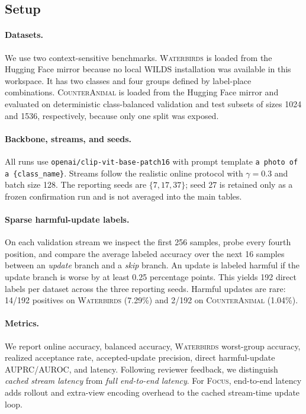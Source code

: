 \documentclass{article}
\newcommand{\focus}{\textsc{Focus}}
\newcommand{\wb}{\textsc{Waterbirds}}
\newcommand{\ca}{\textsc{CounterAnimal}}
\begin{document}
\subsection{Setup}

\paragraph{Datasets.}
We use two context-sensitive benchmarks. \wb{} is loaded from the Hugging Face mirror because no local WILDS installation was available in this workspace. It has two classes and four groups defined by label-place combinations. \ca{} is loaded from the Hugging Face mirror and evaluated on deterministic class-balanced validation and test subsets of sizes 1024 and 1536, respectively, because only one split was exposed.

\paragraph{Backbone, streams, and seeds.}
All runs use \texttt{openai/clip-vit-base-patch16} with prompt template \texttt{a photo of a \{class\_name\}}. Streams follow the realistic online protocol with $\gamma=0.3$ and batch size 128. The reporting seeds are $\{7,17,37\}$; seed 27 is retained only as a frozen confirmation run and is not averaged into the main tables.

\paragraph{Sparse harmful-update labels.}
On each validation stream we inspect the first 256 samples, probe every fourth position, and compare the average labeled accuracy over the next 16 samples between an \emph{update} branch and a \emph{skip} branch. An update is labeled harmful if the update branch is worse by at least 0.25 percentage points. This yields 192 direct labels per dataset across the three reporting seeds. Harmful updates are rare: 14/192 positives on \wb{} (7.29\%) and 2/192 on \ca{} (1.04\%).

\paragraph{Metrics.}
We report online accuracy, balanced accuracy, \wb{} worst-group accuracy, realized acceptance rate, accepted-update precision, direct harmful-update AUPRC/AUROC, and latency. Following reviewer feedback, we distinguish \emph{cached stream latency} from \emph{full end-to-end latency}. For \focus{}, end-to-end latency adds rollout and extra-view encoding overhead to the cached stream-time update loop.
\end{document}
